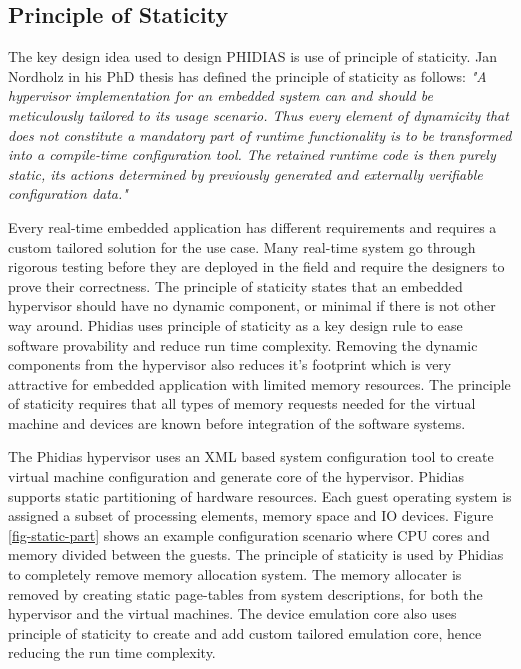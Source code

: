 \subsection{Principle of Staticity}
The key design idea used to design PHIDIAS is use of principle of staticity.
Jan Nordholz in his PhD thesis \cite{nordholz2017design} has defined the principle of staticity as follows:
\emph {"A hypervisor implementation for an embedded system can
and should be meticulously tailored to its usage scenario. Thus
every element of dynamicity that does not constitute a mandatory 
part of runtime functionality is to be transformed into a
compile-time configuration tool. The retained runtime code is
then purely static, its actions determined by previously generated and externally verifiable configuration data."}

Every real-time embedded application has different requirements and requires a custom tailored solution for the use case. 
Many real-time system go through rigorous testing before they are deployed in the field and require the designers to prove their correctness.
The principle of staticity states that an embedded hypervisor should have no dynamic component, or minimal if there is not other way around.
Phidias uses principle of staticity as a key design rule to ease software provability and reduce run time complexity. 
Removing the dynamic components from the hypervisor also reduces it's footprint which is very attractive for embedded application with limited
memory resources.
The principle of staticity requires that all types of memory requests needed for the virtual machine and devices are known 
before integration of the software systems.

The Phidias hypervisor uses an XML based system configuration tool to create virtual machine configuration and generate
core of the hypervisor. Phidias supports static partitioning of hardware resources. 
Each guest operating system is assigned a subset of processing elements, memory space and IO devices.
Figure \ref{fig-static-part} shows an example configuration scenario where CPU cores and memory divided between the guests.
The principle of staticity is used by Phidias to completely remove memory allocation system.
The memory allocater is removed by creating static page-tables from system descriptions, for both the hypervisor and the virtual machines.
The device emulation core also uses principle of staticity to create and add custom tailored emulation core,
hence reducing the run time complexity.



